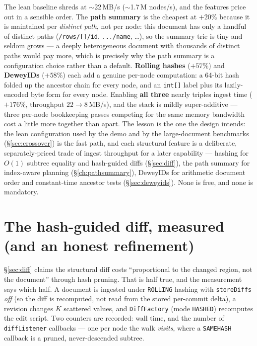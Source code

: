 \documentclass[11pt,a4paper,oneside]{report}
\theoremstyle{sirixthm}
\newcommand{\code}[1]{\texttt{#1}}
\begin{document}
The lean baseline shreds at $\sim$22\,MB/s ($\sim$1.7\,M nodes/s), and the features price out in a
sensible order. The \textbf{path summary} is the cheapest at $+20\%$ because it is maintained per
\emph{distinct path}, not per node: this document has only a handful of distinct paths
(\code{/rows/[]/id}, \code{.../name}, \ldots), so the summary trie is tiny and seldom grows --- a deeply
heterogeneous document with thousands of distinct paths would pay more, which is precisely why the path
summary is a configuration choice rather than a default. \textbf{Rolling hashes} ($+57\%$) and
\textbf{DeweyIDs} ($+58\%$) each add a genuine per-node computation: a 64-bit hash folded up the ancestor
chain for every node, and an \code{int[]} label plus its lazily-encoded byte form for every node.
Enabling \textbf{all three} nearly triples ingest time ($+176\%$, throughput $22\to8$\,MB/s), and the
stack is mildly super-additive --- three per-node bookkeeping passes competing for the same memory
bandwidth cost a little more together than apart. The lesson is the one the design intends: the lean
configuration used by the demo and by the large-document benchmarks (\S\ref{sec:crossover}) is the fast
path, and each structural feature is a deliberate, separately-priced trade of ingest throughput for a
later capability --- hashing for $O(1)$ subtree equality and hash-guided diffs (\S\ref{sec:diff}), the
path summary for index-aware planning (\S\ref{ch:pathsummary}), DeweyIDs for arithmetic document order
and constant-time ancestor tests (\S\ref{sec:deweyids}). None is free, and none is mandatory.

\section{The hash-guided diff, measured (and an honest refinement)}
\label{sec:diffbench}

\S\ref{sec:diff} claims the structural diff costs ``proportional to the changed region, not the document''
through hash pruning. That is half true, and the measurement says which half. A document is ingested under
\code{ROLLING} hashing with \code{storeDiffs} \emph{off} (so the diff is recomputed, not read from the
stored per-commit delta), a revision changes $K$ scattered values, and \code{DiffFactory} (mode
\code{HASHED}) recomputes the edit script. Two counters are recorded: wall time, and the number of
\code{diffListener} callbacks --- one per node the walk \emph{visits}, where a \code{SAMEHASH} callback is
a pruned, never-descended subtree.
\end{document}
